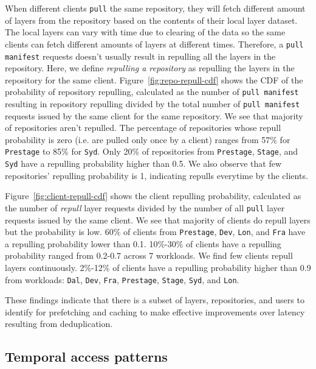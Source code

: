 When different clients \texttt{pull} the same repository, 
they will fetch different amount of layers from the repository based on the contents of their local layer dataset. The local layers can vary with time due to clearing of the data so the same clients can fetch different amounts of layers at different times.
Therefore, a \texttt{pull manifest} requests doesn't usually result in repulling all the layers in the repository. 
Here, we define \emph{repulling a repository} as repulling the layers in the repository for the same client.
Figure~\ref{fig:repo-repull-cdf} shows the CDF of the probability of repository repulling, calculated 
as the number of \texttt{pull manifest} resulting in repository repulling divided by 
the total number of \texttt{pull manifest} requests issued by the same client for the same repository.
We see that majority of repositories aren't repulled.
The percentage of repositories whose repull probability is zero (i.e. are pulled only once by a client) ranges from 57\% for \texttt{Prestage} to 85\% for \texttt{Syd}.
Only 20\% of repositories from  \texttt{Prestage}, \texttt{Stage}, and 
\texttt{Syd} have a repulling probability higher than 0.5.
We also observe that few repositories' repulling probability is 1, indicating repulls everytime by the clients.

Figure~\ref{fig:client-repull-cdf} shows the client repulling probability, calculated as the number of \emph{repull} layer requests divided by
the number of all \texttt{pull} layer requests issued by the same client.
We see that majority of clients do repull layers but the probability is low.
60\% of clients from \texttt{Prestage}, \texttt{Dev}, \texttt{Lon}, and \texttt{Fra} have a repulling probability lower than 0.1.
10\%-30\% of clients have a repulling probability ranged from 0.2-0.7 across 7 workloads.
We find few clients repull layers continuously.
2\%-12\% of clients have a repulling probability higher than 0.9 from workloads:
\texttt{Dal}, \texttt{Dev}, \texttt{Fra}, \texttt{Prestage},
\texttt{Stage}, \texttt{Syd}, and \texttt{Lon}.

These findings indicate that there is a subset of layers, repositories, and users to identify for prefetching and caching to make effective improvements over latency resulting from deduplication.

\subsection{Temporal access patterns}



